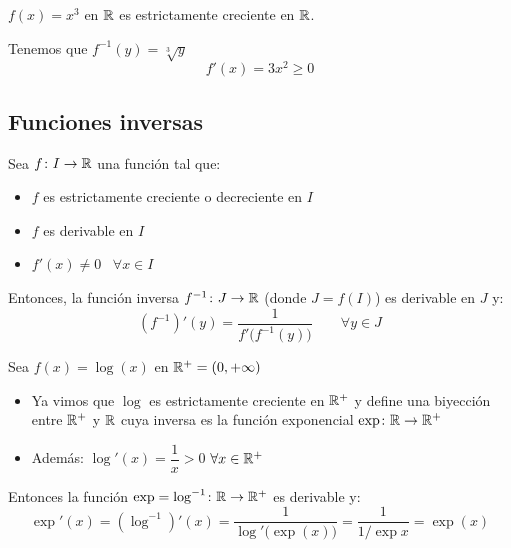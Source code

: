 \documentclass[11pt,a4paper]{article}
\begin{document}
\begin{contraejemplo}
  $f(x)=x^3$ en $\mathbb{R}$ es estrictamente creciente en $\mathbb{R}$.

  Tenemos que $f^{-1}(y)=\sqrt[3]{y}$
  \[
    f'(x)=3x^2\geq 0
  \]
  \begin{center}
  \hspace{2.5cm}
  \end{center}
\end{contraejemplo}


\subsection{Funciones inversas}

\begin{proposicion}
  Sea $f\colon I\to\mathbb{R}$ una función tal que:
  \begin{itemize}
    \item[--] $f$ es estrictamente creciente o decreciente en $I$
    \item[--] $f$ es derivable en $I$
    \item[--] $f'(x)\neq 0$ \ $\forall x\in I$
  \end{itemize}
  Entonces, la función inversa $f^{-1}\colon J\to\mathbb{R}$ (donde $J=f(I)$) es
  derivable en $J$ y:
  \[
    (f^{-1})'(y)=\frac{1}{f'\bigl(f^{-1}(y)\bigr)}\qquad\forall y\in J
  \]
\end{proposicion}

\begin{ejemplo}
  Sea $f(x)=\log(x)$ en $\mathbb{R}^+=(0,+\infty)$
  \begin{itemize}
    \item Ya vimos que $\log$ es estrictamente creciente en $\mathbb{R}^+$ y define
      una biyección entre $\mathbb{R}^+$ y $\mathbb{R}$ cuya inversa es la función
      exponencial $\exp\colon\mathbb{R}\to\mathbb{R}^+$
    \item Además: $\log'(x)=\dfrac{1}{x}>0$ \quad $\forall x\in\mathbb{R}^+$
  \end{itemize}
  Entonces la función $\exp=\log^{-1}\colon\mathbb{R}\to\mathbb{R}^+$ es derivable y:
  \[
    \exp'(x)=(\log^{-1})'(x)=\frac{1}{\log'\bigl(\exp(x)\bigr)}
    =\frac{1}{1/\exp x}=\exp(x)
  \]
\end{ejemplo}
\end{document}
